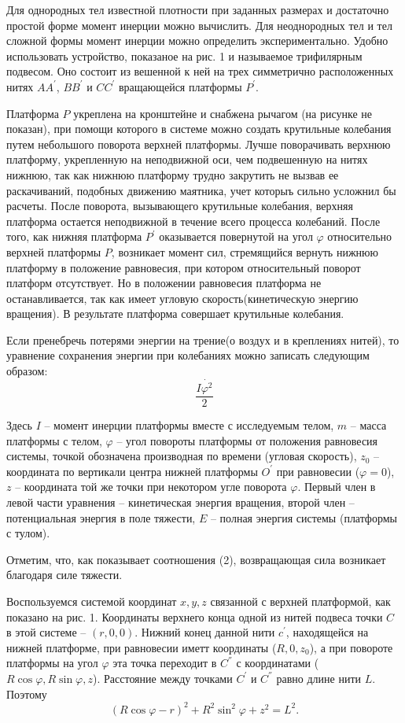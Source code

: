 \documentclass[a4paper,12pt]{article} %
\begin{document}
Для однородных тел известной плотности при заданных размерах и достаточно простой форме момент инерции можно вычислить. Для неоднородных тел и тел сложной формы момент инерции можно определить экспериментально. Удобно использовать устройство, показаное на рис. 1 и называемое трифилярным подвесом. Оно состоит из вешенной к ней на трех симметрично расположенных нитях $AA^{'}$, $BB^{'}$ и $CC^{'}$ вращающейся платформы $P^{'}$.

Платформа $P$ укреплена на кронштейне и снабжена рычагом (на рисунке не показан), при помощи которого в системе можно создать крутильные колебания путем небольшого поворота верхней платформы. Лучше поворачивать верхнюю платформу, укрепленную на неподвижной оси, чем подвешенную на нитях нижнюю, так как нижнюю платформу трудно закрутить не вызвав ее раскачиваний, подобных движению маятника, учет которыъ сильно усложнил бы расчеты. После поворота, вызывающего крутильные колебания, верхняя платформа остается неподвижной в течение всего процесса колебаний. После того, как нижняя платформа $P^{'}$ оказывается повернутой на угол $\varphi$ относительно верхней платформы $P$, возникает момент сил, стремящийся вернуть нижнюю платформу в положение равновесия, при котором относительный поворот платформ отсутствует. Но в положении равновесия платформа не останавливается, так как имеет угловую скорость(кинетическую энергию вращения). В результате платформа совершает крутильные колебания.

Если пренебречь потерями энергии на трение(о воздух и в креплениях нитей), то уравнение сохранения энергии при колебаниях можно записать следующим образом:
\[ \frac{I \dot{\varphi^2}}{2}\]

Здесь $I$ -- момент инерции платформы вместе с исследуемым телом, $m$ -- масса платформы с телом, $\varphi$ -- угол повороты платформы от положения равновесия системы, точкой обозначена производная по времени (угловая скорость), $z_0$ -- координата по вертикали центра нижней платформы $O^{'}$ при равновесии ($\varphi = 0$), $z$ -- координата той же точки при некотором угле поворота $\varphi$. Первый член в левой части уравнения -- кинетическая энергия вращения, второй член -- потенциальная энергия в поле тяжести, $E$ -- полная энергия системы (платформы с тулом).

Отметим, что, как показывает соотношения (2), возвращающая сила возникает благодаря силе тяжести.

Воспользуемся системой координат $x,y,z$ связанной с верхней платформой, как показано на рис. 1. Координаты верхнего конца одной из нитей подвеса точки $C$ в 
этой системе -- $(r, 0, 0)$. Нижний конец данной нити $c^{'}$, находящейся на нижней платформе, при равновесии иметт координаты ($R,0,z_0$), а при повороте платформы на угол $\varphi$ эта точка переходит в $C^{''}$ с координатами ($R \cos{\varphi}, R\sin{\varphi},z$). Расстояние между точками $C^{'}$ и $C^{''}$ равно длине нити $L$. Поэтому 
\[ (R\cos{\varphi} - r)^2 +R^2\sin^2{\varphi} +z^2 = L^2 .\]
\end{document}
